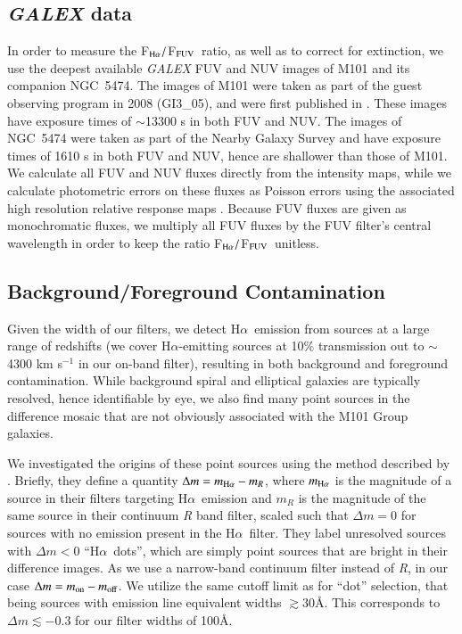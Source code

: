 \documentclass[iop]{emulateapj}
\newcommand{\ha}{H$\alpha$}
\newcommand{\hafuv}{F$_{\rm H\alpha}/$F$_{\rm FUV}$}
\begin{document}
\subsection{\emph{GALEX} data}
In order to measure the \hafuv \ ratio, as well as to correct for
extinction, we use the deepest available \emph{GALEX} FUV and NUV images of
M101 and its companion NGC~5474.  The images of M101 were taken as
part of the guest observing program in 2008 (GI3\_05), and were first
published in \citep{bigiel10}.  These images have exposure times of
$\sim$13300 s in both FUV and NUV.  The images of NGC~5474 were taken
as part of the Nearby Galaxy Survey \citep[NGS;][]{bianchi03} and have
exposure times of 1610 s in both FUV and NUV, hence are shallower than
those of M101.  We calculate all FUV and NUV fluxes directly from the
intensity maps, while we calculate photometric errors on these fluxes
as Poisson errors using the associated high resolution relative
response maps \citep[as discussed in][]{morrissey07}.  Because
  FUV fluxes are given as monochromatic fluxes, we multiply
  all FUV fluxes by the FUV filter's central wavelength in order to
  keep the ratio \hafuv \ unitless.

\subsection{Background/Foreground Contamination}
Given the width of our filters, we detect \ha \ emission from sources
at a large range of redshifts (we cover H$\alpha$-emitting sources at
10\% transmission out to $\sim$4300 km s$^{-1}$ in our on-band
filter), resulting in both background and foreground contamination.
While background spiral and elliptical galaxies are typically
resolved, hence identifiable by eye, we also find many point sources
in the difference mosaic that are not obviously associated with the
M101 Group galaxies.

We investigated the origins of these point sources using the method
described by \citet{kellar12}.  Briefly, they define a quantity
$\Delta m = m_{\rm H\alpha} - m_{R}$, where $m_{\rm H\alpha}$ is the magnitude
of a source in their filters targeting \ha \ emission and $m_{R}$ is
the magnitude of the same source in their continuum \emph{R} band
filter, scaled such that $\Delta m = 0$ for sources with no emission
present in the \ha \ filter.  They label unresolved sources with
$\Delta m < 0$ ``\ha \ dots'', which are simply point sources that are
bright in their difference images.  As we use a narrow-band continuum
filter instead of \emph{R}, in our case $\Delta m = m_{\rm on} -
m_{\rm off}$.  We utilize the same cutoff limit as \citet{kellar12}
for ``dot'' selection, that being sources with emission line
equivalent widths $\gtrsim 30$\AA.  This corresponds to $\Delta m
\lesssim -0.3$ for our filter widths of 100\AA.
\end{document}
